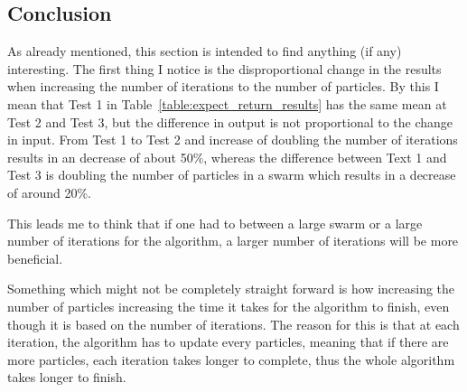 \documentclass{pdfmx4020}
\begin{document}
    \subsection{Conclusion} %
    \label{sub:conclusion}
      As already mentioned, this section is intended to find anything (if any) interesting. The first thing I notice is the disproportional change in the results when increasing the number of iterations to the number of particles. By this I mean that Test 1 in Table~\ref{table:expect_return_results} has the same mean at Test 2 and Test 3, but the difference in output is not proportional to the change in input. From Test 1 to Test 2 and increase of doubling the number of iterations results in an decrease of about 50\%, whereas the difference between Text 1 and Test 3 is doubling the number of particles in a swarm which results in a decrease of around 20\%. 

      This leads me to think that if one had to between a large swarm or a large number of iterations for the algorithm, a larger number of iterations will be more beneficial. 

      Something which might not be completely straight forward is how increasing the number of particles increasing the time it takes for the algorithm to finish, even though it is based on the number of iterations. The reason for this is that at each iteration, the algorithm has to update every particles, meaning that if there are more particles, each iteration takes longer to complete, thus the whole algorithm takes longer to finish.



\end{document}
